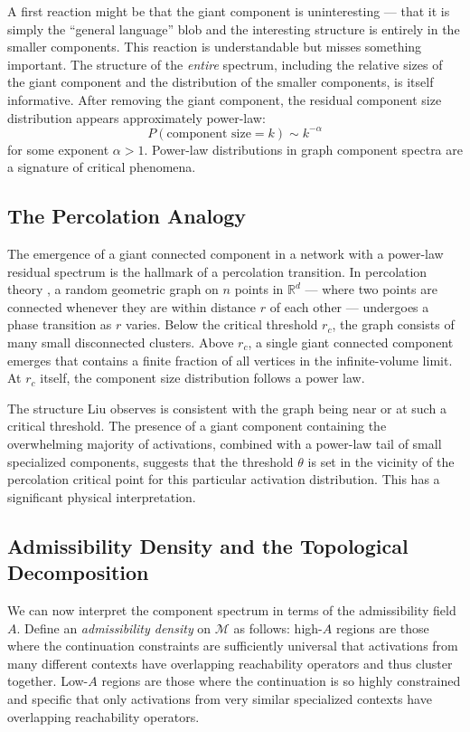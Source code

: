 \documentclass[12pt, a4paper]{article}
\theoremstyle{plain}
\theoremstyle{definition}
\theoremstyle{remark}
\newcommand{\R}{\mathbb{R}}
\newcommand{\cM}{\mathcal{M}}
\newcommand{\fA}{A}
\begin{document}
A first reaction might be that the giant component is uninteresting --- that
it is simply the ``general language'' blob and the interesting structure is
entirely in the smaller components. This reaction is understandable but misses
something important. The structure of the \emph{entire} spectrum, including the
relative sizes of the giant component and the distribution of the smaller
components, is itself informative. After removing the giant component, the
residual component size distribution appears approximately power-law:
\begin{equation}
  P(\text{component size} = k) \sim k^{-\alpha}
\end{equation}
for some exponent $\alpha > 1$. Power-law distributions in graph component
spectra are a signature of critical phenomena.

\subsection{The Percolation Analogy}

The emergence of a giant connected component in a network with a power-law
residual spectrum is the hallmark of a percolation transition. In percolation
theory \cite{stauffer1994percolation}, a random geometric graph on $n$ points
in $\R^d$ --- where two points are connected whenever they are within distance
$r$ of each other --- undergoes a phase transition as $r$ varies. Below the
critical threshold $r_c$, the graph consists of many small disconnected
clusters. Above $r_c$, a single giant connected component emerges that
contains a finite fraction of all vertices in the infinite-volume limit. At
$r_c$ itself, the component size distribution follows a power law.

The structure Liu observes is consistent with the graph being near or at such
a critical threshold. The presence of a giant component containing the
overwhelming majority of activations, combined with a power-law tail of small
specialized components, suggests that the threshold $\theta$ is set in the
vicinity of the percolation critical point for this particular activation
distribution. This has a significant physical interpretation.

\subsection{Admissibility Density and the Topological Decomposition}

We can now interpret the component spectrum in terms of the admissibility field
$\fA$. Define an \emph{admissibility density} on $\cM$ as follows: high-$\fA$
regions are those where the continuation constraints are sufficiently universal
that activations from many different contexts have overlapping reachability
operators and thus cluster together. Low-$\fA$ regions are those where the
continuation is so highly constrained and specific that only activations from
very similar specialized contexts have overlapping reachability operators.
\end{document}
